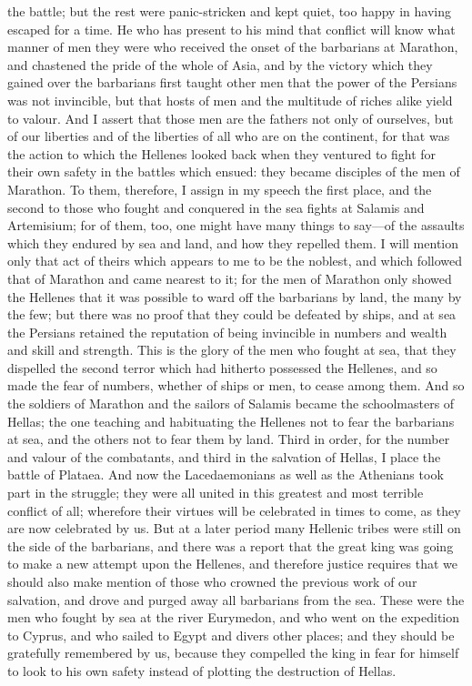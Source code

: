 \documentclass[11pt,letter]{article}
\begin{document}
the battle; but the rest were panic-stricken and kept quiet, too happy in having escaped for a time. He who has present to his mind that conflict will know what manner of men they were who received the onset of the barbarians at Marathon, and chastened the pride of the whole of Asia, and by the victory which they gained over the barbarians first taught other men that the power of the Persians was not invincible, but that hosts of men and the multitude of riches alike yield to valour. And I assert that those men are the fathers not only of ourselves, but of our liberties and of the liberties of all who are on the continent, for that was the action to which the Hellenes looked back when they ventured to fight for their own safety in the battles which ensued: they became disciples of the men of Marathon. To them, therefore, I assign in my speech the first place, and the second to those who fought and conquered in the sea fights at Salamis and Artemisium; for of them, too, one might have many things to say—of the assaults which they endured by sea and land, and how they repelled them. I will mention only that act of theirs which appears to me to be the noblest, and which followed that of Marathon and came nearest to it; for the men of Marathon only showed the Hellenes that it was possible to ward off the barbarians by land, the many by the few; but there was no proof that they could be defeated by ships, and at sea the Persians retained the reputation of being invincible in numbers and wealth and skill and strength. This is the glory of the men who fought at sea, that they dispelled the second terror which had hitherto possessed the Hellenes, and so made the fear of numbers, whether of ships or men, to cease among them. And so the soldiers of Marathon and the sailors of Salamis became the schoolmasters of Hellas; the one teaching and habituating the Hellenes not to fear the barbarians at sea, and the others not to fear them by land. Third in order, for the number and valour of the combatants, and third in the salvation of Hellas, I place the battle of Plataea. And now the Lacedaemonians as well as the Athenians took part in the struggle; they were all united in this greatest and most terrible conflict of all; wherefore their virtues will be celebrated in times to come, as they are now celebrated by us. But at a later period many Hellenic tribes were still on the side of the barbarians, and there was a report that the great king was going to make a new attempt upon the Hellenes, and therefore justice requires that we should also make mention of those who crowned the previous work of our salvation, and drove and purged away all barbarians from the sea. These were the men who fought by sea at the river Eurymedon, and who went on the expedition to Cyprus, and who sailed to Egypt and divers other places; and they should be gratefully remembered by us, because they compelled the king in fear for himself to look to his own safety instead of plotting the destruction of Hellas.
\end{document}
